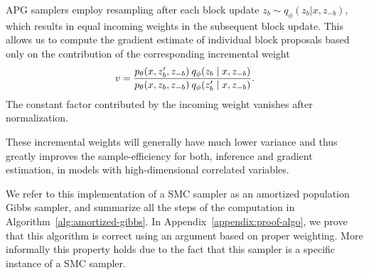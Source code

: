 \documentclass{article}
\theoremstyle{definition}
\begin{document}

APG samplers employ resampling after each block update $z_b \sim q_\phi(z_b | x, z_{-b})$, which results in equal incoming weights in the subsequent block update. This allows us to compute the gradient estimate of individual block proposals based only on the contribution of the corresponding incremental weight 
\begin{align}
    v
    = 
    \frac{p_\theta(x, z'_b, z_{-b}) \: q_\phi(z_b \mid  x, z_{-b})}
         {p_\theta(x, z_b, z_{-b}) \: q_\phi(z'_b \mid  x, z_{-b})}
    .
\end{align}
The constant factor contributed by the incoming weight vanishes after normalization.

These incremental weights will generally have much lower variance and thus greatly improves the sample-efficiency for both, inference and gradient estimation, in models with high-dimensional correlated variables.

We refer to this implementation of a SMC sampler as an amortized population Gibbs sampler, and summarize all the steps of the computation in Algorithm~\ref{alg:amortized-gibbs}. In Appendix~\ref{appendix:proof-algo}, we prove that this algorithm is correct using an argument based on proper weighting. 
More informally this property holds due to the fact that this sampler is a specific instance of a SMC sampler. 
\end{document}
